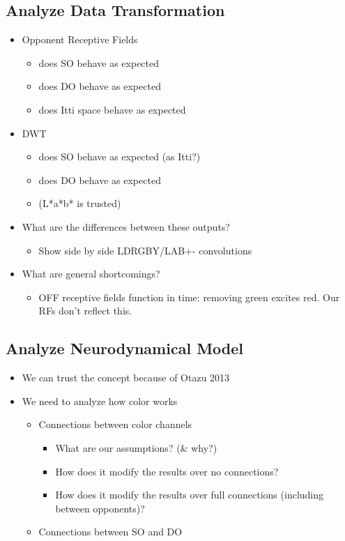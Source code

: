 \documentclass[journal,onecolumn]{IEEEtran}
\begin{document}
\subsection*{Analyze Data Transformation}
\begin{itemize}
    \item Opponent Receptive Fields
    \begin{itemize}
        \item does SO behave as expected
        \item does DO behave as expected
        \item does Itti space behave as expected
    \end{itemize}
    \item DWT
    \begin{itemize}
        \item does SO behave as expected (as Itti?)
        \item does DO behave as expected
        \item (L*a*b* is trusted)
    \end{itemize}
    \item What are the differences between these outputs?
    \begin{itemize}
        \item Show side by side LDRGBY/LAB+- convolutions
    \end{itemize}
    \item What are general shortcomings?
    \begin{itemize}
        \item OFF receptive fields function in time: removing green excites red. Our RFs don't reflect this.
    \end{itemize}
\end{itemize}

\subsection*{Analyze Neurodynamical Model}
\begin{itemize}
    \item We can trust the concept because of Otazu 2013
    \item We need to analyze how color works
    \begin{itemize}
        \item Connections between color channels
        \begin{itemize}
            \item What are our assumptions? (\& why?)
            \item How does it modify the results over no connections?
            \item How does it modify the results over full connections (including between opponents)?
        \end{itemize}
        \item Connections between SO and DO
    \end{itemize}
\end{itemize}
\end{document}
